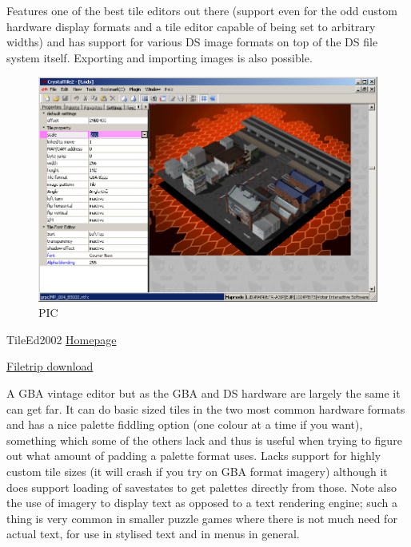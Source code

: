 \documentclass[
]{book}
\begin{document}
Features one of the best tile editors out there (support even for the odd custom hardware display formats and a tile editor capable of being set to arbitrary widths) and has support for various DS image formats on top of the DS file system itself. Exporting and importing images is also possible.

\begin{figure}
\centering
\includegraphics{images/12_home_fast6191_romhackingguide_unrenamed_file___kingguidetileeeditorsshowcasecrystaltile2_1.png}
\caption{PIC}
\end{figure}

TileEd2002 \href{http://home.arcor.de/minako.aino/TilEd2002/}{Homepage}

\href{http://filetrip.net/gba-downloads/tools-utilities/download-tiled2002-064b-f7846.html}{Filetrip download}

A GBA vintage editor but as the GBA and DS hardware are largely the same it can get far. It can do basic sized tiles in the two most common hardware formats and has a nice palette fiddling option (one colour at a time if you want), something which some of the others lack and thus is useful when trying to figure out what amount of padding a palette format uses. Lacks support for highly custom tile sizes (it will crash if you try on GBA format imagery) although it does support loading of savestates to get palettes directly from those. Note also the use of imagery to display text as opposed to a text rendering engine; such a thing is very common in smaller puzzle games where there is not much need for actual text, for use in stylised text and in menus in general.
\end{document}
